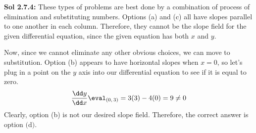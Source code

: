 \begin{tcolorbox}[example]
\begin{oneparchoices}
    \end{oneparchoices}
\end{tcolorbox}
\begin{tcolorbox}[solution]
    \textbf{Sol 2.7.4: } These types of problems are best done by a combination of process of elimination and substituting numbers. Options (a) and (c) all have slopes parallel to one another in each column. Therefore, they cannot be the slope field for the given differential equation, since the given equation has both $x$ and $y$. \par
    \vspace{11pt}
    Now, since we cannot eliminate any other obvious choices, we can move to substitution. Option (b) appears to have horizontal slopes when $x = 0$, so let's plug in a point on the $y$ axis into our differential equation to see if it is equal to zero. \begin{align*}
        \dfrac{\dd y}{\dd x} \eval_{(0, \, 3)} = 3(3) - 4(0) = 9 \neq 0
    \end{align*}
    Clearly, option (b) is not our desired slope field. Therefore, the correct answer is option $\boxed{\text{(d)}}$.
\end{tcolorbox} \vspace{11pt}

